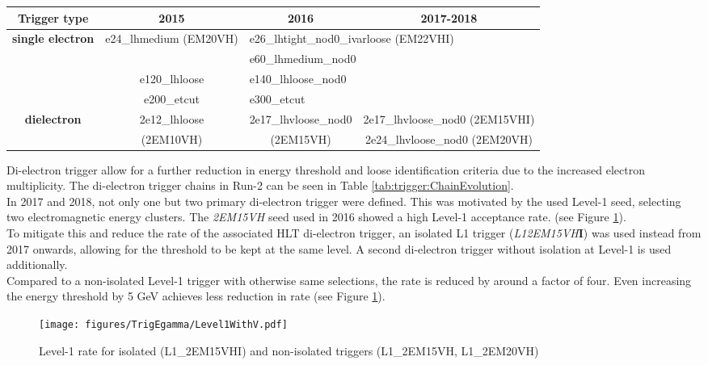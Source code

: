 \begin{table*}
\small
\begin{centering}
\begin{tabular}{|c|c|c|c|}
\hline 
\textbf{Trigger type} & \textbf{2015} & \textbf{2016} & \textbf{2017-2018}\tabularnewline
\hline 
\multirow{4}{*}{\textbf{single electron}} & e24\_lhmedium (EM20VH) & \multicolumn{2}{l|}{e26\_lhtight\_nod0\_ivarloose (EM22VHI)}\tabularnewline
 &  & \multicolumn{2}{l|}{e60\_lhmedium\_nod0}\tabularnewline
 & e120\_lhloose & \multicolumn{2}{l|}{e140\_lhloose\_nod0}\tabularnewline
 & e200\_etcut & \multicolumn{2}{l|}{e300\_etcut}\tabularnewline
\hline 
\multirow{2}{*}{\textbf{dielectron}} & 2e12\_lhloose & 2e17\_lhvloose\_nod0 & 2e17\_lhvloose\_nod0 (2EM15VHI)\tabularnewline
 & (2EM10VH) & (2EM15VH) & 2e24\_lhvloose\_nod0 (2EM20VH)\tabularnewline
\hline 
\end{tabular}
\par\end{centering}
\caption{Evolution of the primary electron trigger during Run-2. given in brackets are the Level-1 seeds used for the given \ac{HLT} trigger.  \label{tab:trigger:ChainEvolution}}
\end{table*}

Di-electron trigger allow for a further reduction in energy threshold and loose identification criteria due to the increased electron multiplicity.  The di-electron trigger chains in Run-2 can be seen in Table \ref{tab:trigger:ChainEvolution}.  \\
In 2017 and 2018,  not only one but two primary di-electron trigger were defined.  This was motivated by the used Level-1 seed,  selecting two electromagnetic energy clusters.  The \textit{2EM15VH} seed used in 2016 showed a high Level-1 acceptance rate. (see Figure \ref{fig:trigg:L1EMrates}).  \\
To mitigate this and reduce the rate of the associated \ac{HLT} di-electron trigger,  an isolated \ac{L1} trigger (\textit{L12EM15VH}\textbf{I}) was used instead from 2017 onwards,  allowing for the threshold to be kept at the same level.  A second di-electron trigger without isolation at Level-1 is used additionally. \\
Compared to a non-isolated Level-1 trigger with otherwise same selections, the rate is reduced by around a factor of four.  Even increasing the energy threshold by 5 GeV achieves less reduction in rate (see Figure \ref{fig:trigg:L1EMrates}).\\

\begin{figure}[h]
  \centering
\texttt{[image: figures/TrigEgamma/Level1WithV.pdf]}
\caption{Level-1 rate for isolated (L1\_{}2EM15VHI) and non-isolated triggers (L1\_{}2EM15VH, L1\_{}2EM20VH) \label{fig:trigg:L1EMrates} \cite{TrigEgammaPaper}}
\end{figure}

